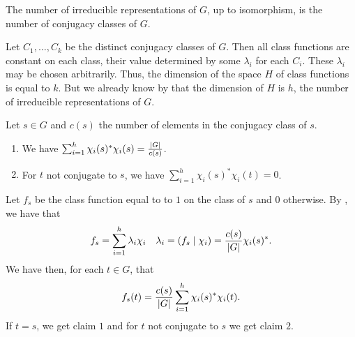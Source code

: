 \documentclass[letterpaper, 11pt, oneside]{book}
\begin{document}
\begin{thrm}\label{thrm:num_irred_cong_classes}
  The number of irreducible representations of $G$, up to isomorphism, is the number of conjugacy classes of $G$.
\end{thrm}
\begin{pf}
  Let $C_{1}, \ldots, C_{k}$ be the distinct conjugacy classes of $G$.
  Then all class functions are constant on each class, their value determined by some $\lambda_{i}$ for each $C_{i}$.
  These $\lambda_{i}$ may be chosen arbitrarily.
  Thus, the dimension of the space $H$ of class functions is equal to $k$.
  But we already know by  that the dimension of $H$ is $h$, the number of irreducible representations of $G$.
\end{pf}

\begin{prop}
  Let $s \in G$ and $c(s)$ the number of elements in the conjugacy class of $s$.
  \begin{enumerate}
  \item We have $\sum_{i = 1}^{h} \chi_{i}(s)^{*} \chi_{i}(s) = \frac{\abs{G}}{c(s)}$.
  \item For $t$ not conjugate to $s$, we have $\sum_{i = 1}^{h} \chi_{i}(s)^{*} \chi_{i}(t) = 0$.
  \end{enumerate}
\end{prop}
\begin{pf}
  Let $f_{s}$ be the class function equal to to $1$ on the class of $s$ and $0$ otherwise.
  By , we have that
  \begin{align*}
    f_{s} = \sum_{i = 1}^{h} \lambda_{i} \chi_{i} && \lambda_{i} = (f_{s} \mid \chi_{i}) = \frac{c(s)}{\abs{G}} \chi_{i}(s)^{*}.
  \end{align*}
  We have then, for each $t \in G$, that
  \[
    f_{s}(t) = \frac{c(s)}{\abs{G}}\sum_{i = 1}^{h} \chi_{i}(s)^{*} \chi_{i}(t).
  \]
  If $t = s$, we get claim $1$ and for $t$ not conjugate to $s$ we get claim $2$.
\end{pf}

\clearpage
\end{document}
